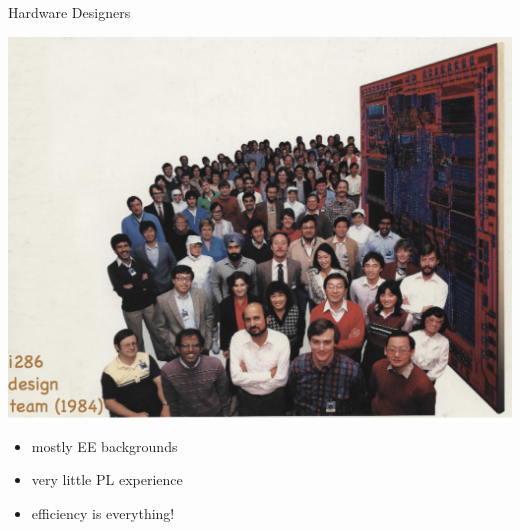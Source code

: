 \documentclass[xcolor=pdflatex,dvipsnames,table]{beamer}
\begin{document}
\begin{frame}[fragile]{Hardware Designers}
\begin{center}
\includegraphics[height=0.6\textheight]{figs/i286-team.png}
\end{center}
\begin{itemize}
\item mostly EE backgrounds
\item very little PL experience
\item efficiency is everything!
\end{itemize}
\end{frame}
\end{document}
